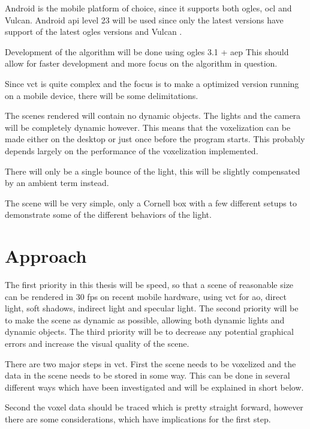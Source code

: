 \documentclass[a4paper, 12pt]{article}
\begin{document}
Android is the mobile platform of choice, since it supports both \gls{ogles}, \gls{ocl} and Vulcan. Android \acrshort{api} level 23 will be used since only the latest versions have support of the latest \gls{ogles} versions and Vulcan .

Development of the algorithm will be done using \gls{ogles} 3.1 + \gls{aep} This should allow for faster development and more focus on the algorithm in question.




Since vct is quite complex and the focus is to make a optimized version running on a mobile device, there will be some delimitations.

The scenes rendered will contain no dynamic objects. The lights and the camera will be completely dynamic however. This means that the voxelization can be made either on the desktop or just once before the program starts. This probably depends largely on the performance of the voxelization implemented.

There will only be a single bounce of the light, this will be slightly compensated by an ambient term instead.

The scene will be very simple, only a Cornell box with a few different setups to demonstrate some of the different behaviors of the light.


\section{Approach}
\label{sec:Approach}

The first priority in this thesis will be speed, so that a scene of reasonable size can be rendered in 30 fps on recent mobile hardware, using \gls{vct} for \gls{ao}, direct light, soft shadows, indirect light and specular light. The second priority will be to make the scene as dynamic as possible, allowing both dynamic lights and dynamic objects. The third priority will be to decrease any potential graphical errors and increase the visual quality of the scene. 

There are two major steps in \gls{vct}. First the scene needs to be voxelized and the data in the scene needs to be stored in some way. This can be done in several different ways which have been investigated and will be explained in short below.

Second the voxel data should be traced which is pretty straight forward, however there are some considerations, which have implications for the first step.
\end{document}
